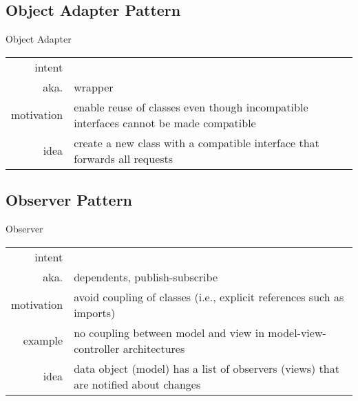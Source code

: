 \subsection{Object Adapter Pattern}
\begin{frame}{\insertsubsection}
	\begin{fancycolumns}
		\begin{definition}{Object Adapter \mysource{\gofen}}
			\setlength\tabcolsep{1mm}
			\begin{tabularx}{\textwidth}{rX}				
				intent & \mycite{Convert the interface of a class into another interface clients expect. Adapter lets classes work together that couldn't otherwise because of incompatible interfaces.}\\
				aka. & wrapper\\
				motivation & enable reuse of classes even though incompatible interfaces cannot be made compatible\\
				idea & create a new class with a compatible interface that forwards all requests
			\end{tabularx}
		\end{definition}
		\nextcolumn
	\end{fancycolumns}
\end{frame}

\subsection{Observer Pattern}
\begin{frame}{\insertsubsection}
	\begin{fancycolumns}
		\begin{definition}{Observer \mysource{\gofen}}
			\setlength\tabcolsep{1mm}
			\begin{tabularx}{\textwidth}{rX}				
				intent & \mycite{Define a one-to-many dependency between objects so that when one object changes state, all its dependents are notified and updated automatically.}\\
				aka. & dependents, publish-subscribe\\
				motivation & avoid coupling of classes (i.e., explicit references such as imports)\\
				example & no coupling between model and view in model-view-controller architectures\\
				idea & data object (model) has a list of observers (views) that are notified about changes
			\end{tabularx}
		\end{definition}
		\nextcolumn
		\observer{width=\linewidth}
	\end{fancycolumns}
\end{frame}

